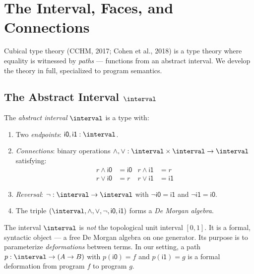 
\chapter{The Interval, Faces, and Connections}
\label{ch:interval}

Cubical type theory (CCHM, 2017; Cohen et al., 2018) is a type theory
where equality is witnessed by \emph{paths} --- functions from an
abstract interval.  We develop the theory in full, specialized to
program semantics.

\section{The Abstract Interval $\interval$}

\begin{definition}
The \emph{abstract interval} $\interval$ is a type with:
\begin{enumerate}
  \item Two \emph{endpoints}: $\mathsf{i0}, \mathsf{i1} : \interval$.
  \item \emph{Connections}: binary operations $\land, \lor : \interval
    \times \interval \to \interval$ satisfying:
    \begin{align}
      r \land \mathsf{i0} &= \mathsf{i0} &
      r \land \mathsf{i1} &= r \\
      r \lor \mathsf{i0} &= r &
      r \lor \mathsf{i1} &= \mathsf{i1}
    \end{align}
  \item \emph{Reversal}: $\lnot : \interval \to \interval$ with
    $\lnot \mathsf{i0} = \mathsf{i1}$ and
    $\lnot \mathsf{i1} = \mathsf{i0}$.
  \item The triple $(\interval, \land, \lor, \lnot, \mathsf{i0},
    \mathsf{i1})$ forms a \emph{De Morgan algebra}.
\end{enumerate}
\end{definition}

\begin{remark}
The interval $\interval$ is \emph{not} the topological unit interval
$[0,1]$.  It is a formal, syntactic object --- a free De Morgan algebra
on one generator.  Its purpose is to parameterize \emph{deformations}
between terms.  In our setting, a path $p : \interval \to (A \to B)$
with $p(\mathsf{i0}) = f$ and $p(\mathsf{i1}) = g$ is a formal
deformation from program $f$ to program $g$.
\end{remark}


